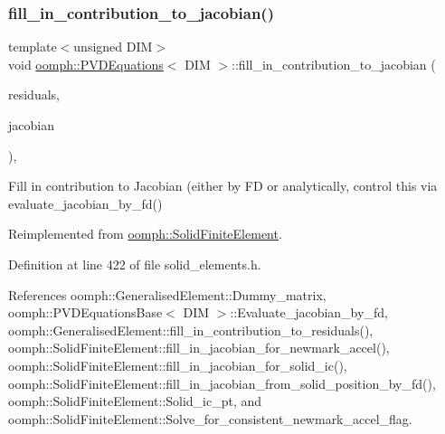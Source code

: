 \subsubsection{\texorpdfstring{fill\+\_\+in\+\_\+contribution\+\_\+to\+\_\+jacobian()}{fill\_in\_contribution\_to\_jacobian()}}
{\footnotesize\ttfamily template$<$unsigned D\+IM$>$ \\
void \hyperlink{classoomph_1_1PVDEquations}{oomph\+::\+P\+V\+D\+Equations}$<$ D\+IM $>$\+::fill\+\_\+in\+\_\+contribution\+\_\+to\+\_\+jacobian (\begin{DoxyParamCaption}\item[{\hyperlink{classoomph_1_1Vector}{Vector}$<$ double $>$ \&}]{residuals,  }\item[{\hyperlink{classoomph_1_1DenseMatrix}{Dense\+Matrix}$<$ double $>$ \&}]{jacobian }\end{DoxyParamCaption})\hspace{0.3cm}{\ttfamily [inline]}, {\ttfamily [virtual]}}



Fill in contribution to Jacobian (either by FD or analytically, control this via evaluate\+\_\+jacobian\+\_\+by\+\_\+fd() 



Reimplemented from \hyperlink{classoomph_1_1SolidFiniteElement_a3167a2005e33815948bef357214e15ee}{oomph\+::\+Solid\+Finite\+Element}.



Definition at line 422 of file solid\+\_\+elements.\+h.



References oomph\+::\+Generalised\+Element\+::\+Dummy\+\_\+matrix, oomph\+::\+P\+V\+D\+Equations\+Base$<$ D\+I\+M $>$\+::\+Evaluate\+\_\+jacobian\+\_\+by\+\_\+fd, oomph\+::\+Generalised\+Element\+::fill\+\_\+in\+\_\+contribution\+\_\+to\+\_\+residuals(), oomph\+::\+Solid\+Finite\+Element\+::fill\+\_\+in\+\_\+jacobian\+\_\+for\+\_\+newmark\+\_\+accel(), oomph\+::\+Solid\+Finite\+Element\+::fill\+\_\+in\+\_\+jacobian\+\_\+for\+\_\+solid\+\_\+ic(), oomph\+::\+Solid\+Finite\+Element\+::fill\+\_\+in\+\_\+jacobian\+\_\+from\+\_\+solid\+\_\+position\+\_\+by\+\_\+fd(), oomph\+::\+Solid\+Finite\+Element\+::\+Solid\+\_\+ic\+\_\+pt, and oomph\+::\+Solid\+Finite\+Element\+::\+Solve\+\_\+for\+\_\+consistent\+\_\+newmark\+\_\+accel\+\_\+flag.

\mbox{\label{classoomph_1_1PVDEquations_ad21ebcee8cb3539af51304acad82f79c}} 
